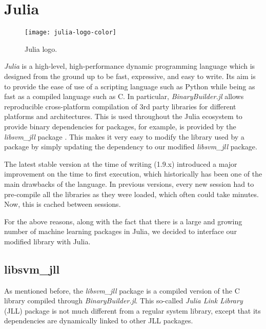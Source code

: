 \section{Julia}%
\label{sub:impl_julia}

\begin{wrapfigure}{r}{.40\textwidth}
    \texttt{[image: julia-logo-color]}
    \caption{Julia logo.\protect\footnotemark}
    \label{fig:julia_logo}
\end{wrapfigure}

\emph{Julia} \cite{bezanson2017julia} is a high-level, high-performance dynamic
programming language which is designed from the ground up to be fast,
expressive, and easy to write. Its aim is to provide the ease of use of a
scripting language such as Python while being as fast as a compiled language
such as C. In particular, \emph{BinaryBuilder.jl}
\cite{JLLPackagesBinaryBuilder} allows reproducible cross-platform compilation
of 3rd party libraries for different platforms and architectures. This is used
throughout the Julia ecosystem to provide binary dependencies for packages, for
example, \libsvm is provided by the \emph{libsvm\_jll} package
\cite{LibsvmJllJl2022}. This makes it very easy to modify the \libsvm
library used by a package by simply updating the dependency to our modified
\emph{libsvm\_jll} package.

The latest stable version at the time of writing (1.9.x) introduced a major
improvement on the time to first execution, which historically has been one of
the main drawbacks of the language. In previous versions, every new session had
to pre-compile all the libraries as they were loaded, which often could take
minutes. Now, this is cached between sessions\cite{JuliaV1Release}.

For the above reasons, along with the fact that there is a large and growing
number of machine learning packages in Julia, we decided to interface our
modified \libsvm library with Julia.

\subsection{libsvm\_jll}

As mentioned before, the \emph{libsvm\_jll} package is a compiled version of the
\libsvm C library compiled through \emph{BinaryBuilder.jl}. This so-called
\emph{Julia Link Library} (JLL) package is not much different from a regular
system library, except that its dependencies are dynamically linked to other JLL
packages.

